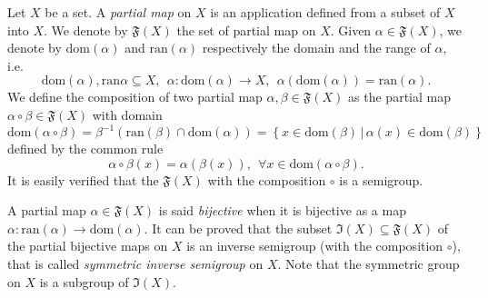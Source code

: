 \documentclass[12pt]{article}
\begin{document}
\newcommand{\domi}{\mathrm{dom}}
\newcommand{\rang}{\mathrm{ran}}
\newcommand{\FFF}{\mathfrak{F}}
\newcommand{\III}{\mathfrak{I}}
\newcommand{\cbra}[1]{\left( #1 \right)}
\newcommand{\qbra}[1]{\left[ #1 \right]}
\newcommand{\gbra}[1]{\left\{ #1 \right\}}
\newcommand{\abra}[1]{\left\langle #1 \right\rangle}

Let $X$ be a set. A \emph{partial map} on $X$ is an application defined from a subset of $X$ into $X$. We denote by $\FFF(X)$ the set of partial map on $X$. Given $\alpha\in\FFF(X)$, we denote by $\domi(\alpha)$ and $\rang(\alpha)$ respectively the domain and the range of $\alpha$, i.e. $$\domi(\alpha),\rang{\alpha}\subseteq X,\ \ \alpha:\domi(\alpha)\rightarrow X,\ \ \alpha(\domi(\alpha))=\rang(\alpha).$$
We define the composition of two partial map $\alpha,\beta\in\FFF(X)$ as the partial map $\alpha\circ\beta\in\FFF(X)$ with domain 
$$\domi(\alpha\circ\beta)=\beta^{-1}(\rang(\beta)\cap\domi(\alpha))=\gbra{x\in\domi(\beta)\,|\,\alpha(x)\in\domi(\beta)}$$
defined by the common rule
$$\alpha\circ\beta(x)=\alpha(\beta(x)),\ \ \forall x\in\domi{(\alpha\circ\beta)}.$$
It is easily verified that the $\FFF(X)$ with the composition $\circ$ is a semigroup. 

A partial map $\alpha\in\FFF(X)$ is said \emph{bijective} when it is bijective as a map $\alpha:\rang(\alpha)\rightarrow\domi(\alpha)$. It can be proved that the subset $\III(X)\subseteq\FFF(X)$ of the partial bijective maps on $X$ is an inverse semigroup (with the composition $\circ$), that is called \emph{symmetric inverse semigroup} on $X$. Note that the symmetric group on $X$ is a subgroup of $\III(X)$.
\end{document}
